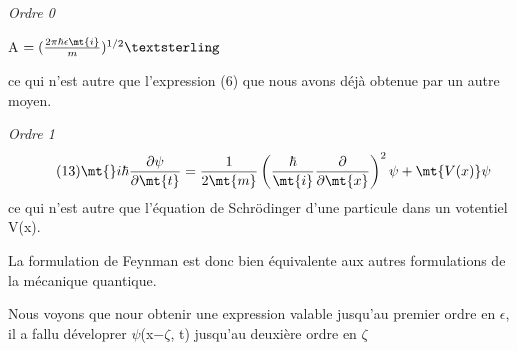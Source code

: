 {\it Ordre 0}
\begin{center}
A $= ( \frac{2\pi\hbar\epsilon\mt{i}}{m} )^{1/2}£$
\end{center}
ce qui n'est autre que l'expression (6) que nous avons déjà obtenue par
un autre moyen.

{\it Ordre 1}
\[
\tag{13} \mt{}i\hbar\frac{\partial\psi}{\partial\mt{t}} =
\frac{1}{2\mt{m}}\left(\frac{\hbar}{\mt{i}}\frac{\partial}{\partial\mt{x}}\right)^2\psi
+\mt{V(x)}\psi
\]
ce qui n'est autre que l'équation de Schrödinger d'une particule dans un
votentiel V(x).

La formulation de Feynman est donc bien équivalente aux autres
formulations de la mécanique quantique.

Nous voyons que nour obtenir une expression valable jusqu'au premier ordre
en $\epsilon$, il a fallu déveloprer $\psi$(x$-\zeta$, t) jusqu'au deuxière ordre en $\zeta$
%
